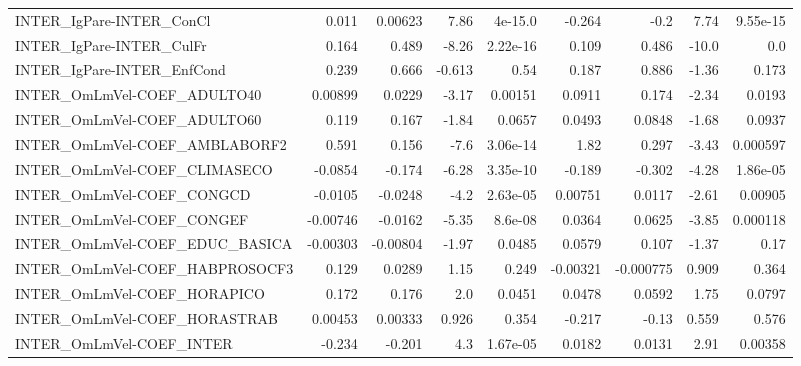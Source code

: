 \begin{tabular}{lrrrrrrrr}
INTER\_IgPare-INTER\_ConCl               &       0.011 &      0.00623 &    7.86 &  4e-15.0 &     -0.264 &        -0.2 &         7.74 &      9.55e-15 \\
INTER\_IgPare-INTER\_CulFr               &       0.164 &        0.489 &   -8.26 & 2.22e-16 &      0.109 &       0.486 &        -10.0 &           0.0 \\
INTER\_IgPare-INTER\_EnfCond             &       0.239 &        0.666 &  -0.613 &     0.54 &      0.187 &       0.886 &        -1.36 &         0.173 \\
INTER\_OmLmVel-COEF\_ADULTO40            &     0.00899 &       0.0229 &   -3.17 &  0.00151 &     0.0911 &       0.174 &        -2.34 &        0.0193 \\
INTER\_OmLmVel-COEF\_ADULTO60            &       0.119 &        0.167 &   -1.84 &   0.0657 &     0.0493 &      0.0848 &        -1.68 &        0.0937 \\
INTER\_OmLmVel-COEF\_AMBLABORF2          &       0.591 &        0.156 &    -7.6 & 3.06e-14 &       1.82 &       0.297 &        -3.43 &      0.000597 \\
INTER\_OmLmVel-COEF\_CLIMASECO           &     -0.0854 &       -0.174 &   -6.28 & 3.35e-10 &     -0.189 &      -0.302 &        -4.28 &      1.86e-05 \\
INTER\_OmLmVel-COEF\_CONGCD              &     -0.0105 &      -0.0248 &    -4.2 & 2.63e-05 &    0.00751 &      0.0117 &        -2.61 &       0.00905 \\
INTER\_OmLmVel-COEF\_CONGEF              &    -0.00746 &      -0.0162 &   -5.35 &  8.6e-08 &     0.0364 &      0.0625 &        -3.85 &      0.000118 \\
INTER\_OmLmVel-COEF\_EDUC\_BASICA         &    -0.00303 &     -0.00804 &   -1.97 &   0.0485 &     0.0579 &       0.107 &        -1.37 &          0.17 \\
INTER\_OmLmVel-COEF\_HABPROSOCF3         &       0.129 &       0.0289 &    1.15 &    0.249 &   -0.00321 &   -0.000775 &        0.909 &         0.364 \\
INTER\_OmLmVel-COEF\_HORAPICO            &       0.172 &        0.176 &     2.0 &   0.0451 &     0.0478 &      0.0592 &         1.75 &        0.0797 \\
INTER\_OmLmVel-COEF\_HORASTRAB           &     0.00453 &      0.00333 &   0.926 &    0.354 &     -0.217 &       -0.13 &        0.559 &         0.576 \\
INTER\_OmLmVel-COEF\_INTER               &      -0.234 &       -0.201 &     4.3 & 1.67e-05 &     0.0182 &      0.0131 &         2.91 &       0.00358 \\

\end{tabular}
